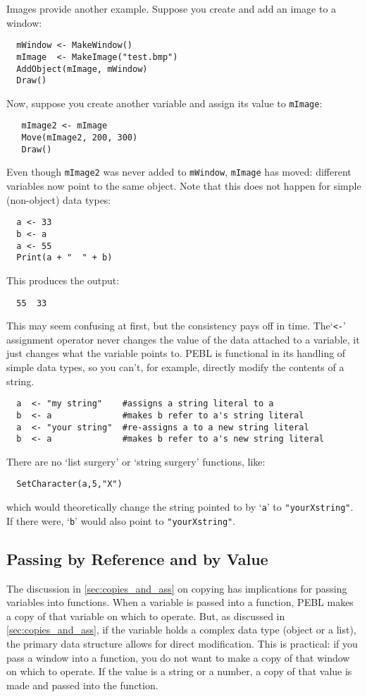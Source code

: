 Images provide another example. Suppose you create and add an image to a window:
\begin{verbatim}
  mWindow <- MakeWindow()
  mImage  <- MakeImage("test.bmp")
  AddObject(mImage, mWindow)
  Draw()
\end{verbatim}
Now, suppose you create another variable and assign its
value to \texttt{mImage}:
\begin{verbatim}
   mImage2 <- mImage
   Move(mImage2, 200, 300)
   Draw()
\end{verbatim}
Even though \texttt{mImage2} was never added to \texttt{mWindow}, \texttt{mImage}
has moved: different variables now point to the same object. Note that this does not happen for simple (non-object) data types:
\begin{verbatim}
  a <- 33
  b <- a
  a <- 55
  Print(a + "  " + b)
\end{verbatim}
This produces the output:
\begin{verbatim}
  55  33
\end{verbatim} 
This may seem  confusing at first, but the consistency pays off in time.  The`\verb+<-+'
assignment operator never changes the value of the data attached to a
variable, it just changes what the variable points to.  PEBL is 
functional in its handling of simple data types, so you can't, for
example, directly modify the contents of a string.
\begin{verbatim}
  a  <- "my string"    #assigns a string literal to a
  b  <- a              #makes b refer to a's string literal
  a  <- "your string"  #re-assigns a to a new string literal
  b  <- a              #makes b refer to a's new string literal
\end{verbatim}
There are no `list surgery' or `string surgery' functions, like: 
\begin{verbatim}
  SetCharacter(a,5,"X")
\end{verbatim}
which would theoretically change the string pointed to by `\texttt{a}' to 
\texttt{"yourXstring"}.  If there were, `\texttt{b}' would also point to \texttt{"yourXstring"}.

\subsection{Passing by Reference and by Value}

The discussion in \ref{sec:copies_and_ass} on copying has implications for passing
variables into functions.  When a variable is passed into a function, PEBL makes a copy of that variable on which to operate. But, as discussed in \ref{sec:copies_and_ass}, if the variable holds a complex data
type (object or a list), the primary data structure allows for direct modification.  This is practical: if you pass a
window into a function, you do not want to make a copy of
that window on which to operate.  If the value is a string or a
number, a copy of that value is made and passed into the function.
  

